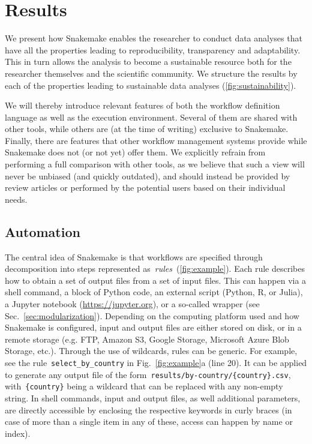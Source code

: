 \documentclass[parskip=half, DIV=18]{scrartcl}
\let\plainurl\url
\renewcommand{\url}[1]{\protect\plainurl{#1}}
\begin{document}
\section{Results}

We present how Snakemake enables the researcher to conduct data analyses that have all the properties leading to reproducibility, transparency and adaptability. This in turn allows the analysis to become a sustainable resource both for the researcher themselves and the scientific community. 
We structure the results by each of the properties leading to sustainable data analyses (\autoref{fig:sustainability}).

We will thereby introduce relevant features of both the workflow definition language as well as the execution environment.
Several of them are shared with other tools, while others are (at the time of writing) exclusive to Snakemake.
Finally, there are features that other workflow management systems provide while Snakemake does not (or not yet) offer them.
We explicitly refrain from performing a full comparison with other tools, as we believe that such a view will never be unbiased (and quickly outdated), and should instead be provided by review articles or performed by the potential users based on their individual needs.

\subsection{Automation}\label{sec:automation}

The central idea of Snakemake is that workflows are specified through decomposition into steps represented as~\emph{rules~}(\autoref{fig:example}).
Each rule describes how to obtain a set of output files from a set of input files.
This can happen via a shell command, a block of Python code, an external script (Python, R, or Julia), a Jupyter notebook (\url{https://jupyter.org}), or a so-called wrapper (see Sec.~\ref{sec:modularization}).
Depending on the computing platform used and how Snakemake is configured, input and output files are either stored on disk, or in a remote storage (e.g. FTP, Amazon S3, Google Storage, Microsoft Azure Blob Storage, etc.).
Through the use of wildcards, rules can be generic.
For example, see the rule~\lstinline!select_by_country! in Fig.~\ref{fig:example}a (line 20).
It can be applied to generate any output file of the form~\lstinline!results/by-country/{country}.csv!, with~\lstinline!{country}! being a wildcard that can be replaced with any non-empty string.
In shell commands, input and output files, as well additional parameters, are directly accessible by enclosing the respective keywords in curly braces (in case of more than a single item in any of these, access can happen by name or index).
\end{document}
